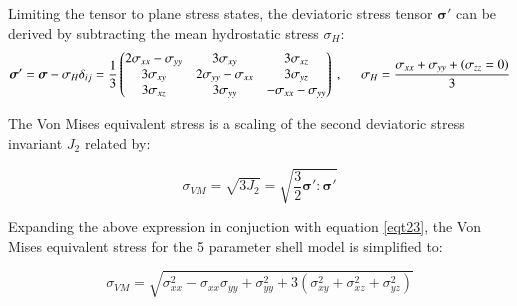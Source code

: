 Limiting the tensor to plane stress states, the deviatoric stress tensor $\boldsymbol{\sigma}'$ can be derived by subtracting the mean hydrostatic stress $\sigma_{H}$:
\begin{equation} 
\boldsymbol{\sigma}' = \boldsymbol{\sigma} - \sigma_{H} \delta_{ij} = 
\frac{1}{3}
\begin{pmatrix}
2\sigma_{xx}-\sigma_{yy} & 3\sigma_{xy} & 3\sigma_{xz} \\
3\sigma_{xy} & 2\sigma_{yy}-\sigma_{xx} & 3\sigma_{yz} \\
3\sigma_{xz} & 3\sigma_{yy} & -\sigma_{xx}-\sigma_{yy} \\
\end{pmatrix}\ ,
\hspace{5mm}
\sigma_{H} = \frac{\sigma_{xx} + \sigma_{yy} + (\sigma_{zz} = 0)}{3}
\label{eqt23}
\end{equation}

The Von Mises equivalent stress is a scaling of the second deviatoric stress invariant $J_2$ related by:

\begin{equation} 
\sigma_{VM} = \sqrt{3J_2} = \sqrt{\frac{3}{2}\boldsymbol{\sigma}' : \boldsymbol{\sigma}'}
\label{eqt24}
\end{equation}

Expanding the above expression in conjuction with equation \ref{eqt23}, the Von Mises equivalent stress for the 5 parameter shell model is simplified to:

\begin{equation} 
\sigma_{VM} = 
\sqrt{
\sigma_{xx}^2
- \sigma_{xx}\sigma_{yy}
+ \sigma_{yy}^2
+ 3(\sigma_{xy}^2 + \sigma_{xz}^2 + \sigma_{yz}^2)
}
\label{eqt25}
\end{equation}